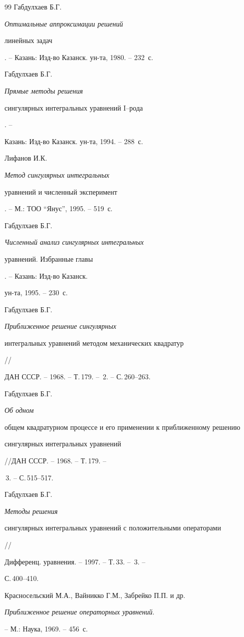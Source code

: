 \begin{thebibliography}{99}
Габдулхаев Б.Г. {\em Оптимальные аппроксимации решений


линейных задач}. -- Казань: Изд-во Казанск. ун-та, 1980. -- 232~с.




Габдулхаев Б.Г. {\em Прямые методы решения


сингулярных интегральных уравнений $\mathrm I$--рода}. --


Казань: Изд-во Казанск. ун-та, 1994. -- 288~с.




Лифанов И.К. {\em Метод сингулярных интегральных


уравнений и численный эксперимент}. -- М.: ТОО ``Янус'', 1995. -- 519~с.




Габдулхаев Б.Г. {\em Численный анализ сингулярных интегральных


уравнений. Избранные главы}. -- Казань: Изд-во Казанск.


ун-та, 1995. -- 230~с.




Габдулхаев Б.Г. {\em Приближенное решение сингулярных


интегральных уравнений методом механических квадратур} //


ДАН СССР. -- 1968. -- Т.\,179. -- \No\,2. -- С.\,260--263.




Габдулхаев Б.Г. {\em Об одном


общем квадратурном процессе и его применении к приближенному решению


сингулярных интегральных уравнений} //ДАН СССР. -- 1968. -- Т.\,179. --


\No\,3. -- С.\,515--517.




Габдулхаев Б.Г. {\em Методы решения


сингулярных интегральных уравнений с положительными операторами} //


Дифференц. уравнения. -- 1997. -- Т.\,33. -- \No\,3. --


С.\,400--410.




Красносельский М.А., Вайникко Г.М., Забрейко П.П. и др.


{\em Приближенное решение операторных уравнений}. 


-- М.: Наука, 1969. -- 456~с.





\end{thebibliography}





\vskip 0.5cm












\label{end}





